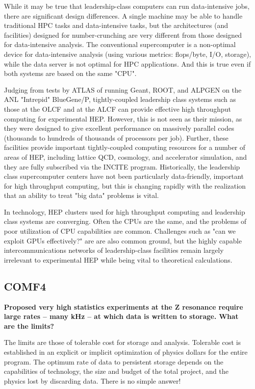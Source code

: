 While it may be true that leadership-class computers can run data-intensive jobs, there are significant design differences.  A single machine may be able to handle traditional HPC tasks and data-intensive tasks, but the architectures (and facilities) designed for number-crunching are very different from those designed for data-intensive analysis. The conventional supercomputer is a non-optimal device for data-intensive analysis (using various metrics: flops/byte, I/O, storage), while the data server is not optimal for HPC applications. And this is true even if both systems are based on the same "CPU".

Judging from tests by ATLAS of running Geant, ROOT, and ALPGEN on the ANL "Intrepid" BlueGene/P, tightly-coupled leadership class systems such as those at the OLCF and at the ALCF can provide effective high throughput computing for experimental HEP.  However, this is not seen as their mission, as they were designed to give excellent performance on massively parallel codes (thousands to hundreds of thousands of processors per job).  Further, these facilities provide important tightly-coupled computing resources for a number of areas of HEP, including lattice QCD, cosmology, and accelerator simulation, and they are fully subscribed via the INCITE program.  Historically, the leadership class supercomputer centers have not been particularly data-friendly, important for high throughput computing, but this is changing rapidly with the realization that an ability to treat "big data" problems is vital.

In technology, HEP clusters used for high throughput computing and leadership class systems are converging.  Often the CPUs are the same, and the problems of poor utilization of CPU capabilities are common. Challenges such as "can we exploit GPUs effectively?" are are also common ground, but the highly capable intercommunications networks of leadership-class facilities remain largely irrelevant to experimental HEP while being vital to theoretical calculations.


\subsection{COMF4}

{\bf
 Proposed very high statistics experiments at the Z resonance require large rates --
many kHz -- at which data is written to storage. What are the limits?}


The limits are those of tolerable cost for storage and analysis.
Tolerable cost is established in an explicit or implicit optimization of
physics dollars for the entire program.  The optimum rate of data to persistent
storage depends on the capabilities of technology, the size and budget of
the total project, and the physics lost by discarding data. There is no
simple answer!

